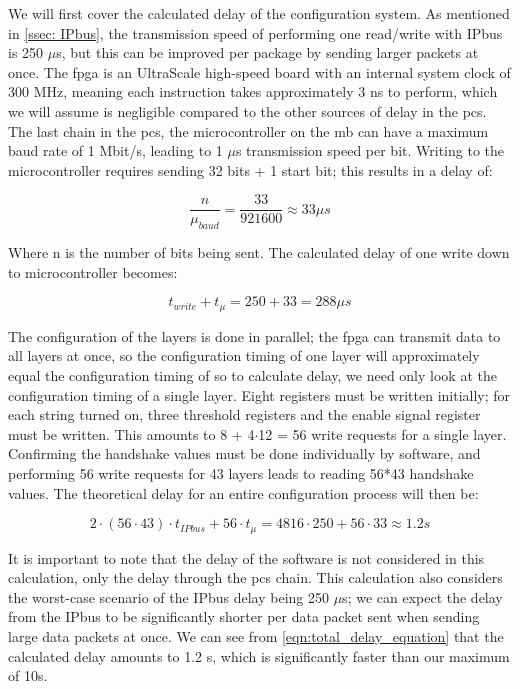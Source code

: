 \documentclass[main.tex]{subfiles}
\begin{document}
We will first cover the calculated delay of the configuration system. As mentioned in \autoref{ssec: IPbus}, the transmission speed of performing one read/write with IPbus is 250 $\mu$s, but this can be improved per package by sending larger packets at once. The \gls{fpga} is an UltraScale high-speed board with an internal system clock of 300 MHz, meaning each instruction takes approximately 3 ns to perform, which we will assume is negligible compared to the other sources of delay in the \gls{pcs}. The last chain in the \gls{pcs}, the microcontroller on the \gls{mb} can have a maximum baud rate of 1 Mbit/s, leading to 1 $\mu$s transmission speed per bit. Writing to the microcontroller requires sending 32 bits + 1 start bit; this results in a delay of: 

\begin{equation} \label{eqn:mu_calculation}
\frac{n}{\mu_{baud}}=\frac{33}{921600}\approx33 \mu s
\end{equation}

Where n is the number of bits being sent. The calculated delay of one write down to microcontroller becomes:

\begin{equation} \label{eqn:write_delay_equation}
t_{write}+t_{\mu }= 250 + 33 = 288\mu s
\end{equation}

The configuration of the layers is done in parallel; the \gls{fpga} can transmit data to all layers at once, so the configuration timing of one layer will approximately equal the configuration timing of so to calculate delay, we need only look at the configuration timing of a single layer. Eight registers must be written initially; for each string turned on, three threshold registers and the enable signal register must be written. This amounts to 8 + 4$\cdot$12 = 56 write requests for a single layer. Confirming the handshake values must be done individually by software, and performing 56 write requests for 43 layers leads to reading 56*43 handshake values. The theoretical delay for an entire configuration process will then be:

\begin{equation} \label{eqn:total_delay_equation}
2\cdot(56\cdot43)\cdot t_{IPbus}+56\cdot t_{\mu }= 4816 \cdot 250 + 56\cdot33 \approx 1.2 s
\end{equation}

It is important to note that the delay of the software is not considered in this calculation, only the delay through the \gls{pcs} chain. This calculation also considers the worst-case scenario of the IPbus delay being 250 $\mu$s; we can expect the delay from the IPbus to be significantly shorter per data packet sent when sending large data packets at once. We can see from \autoref{eqn:total_delay_equation} that the calculated delay amounts to 1.2 s, which is significantly faster than our maximum of 10s.
\end{document}
